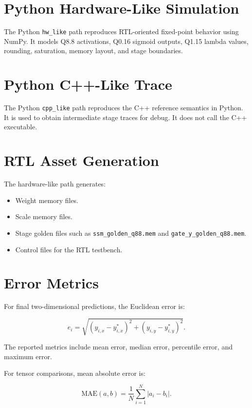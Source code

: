 \section{Python Hardware-Like Simulation}

The Python \texttt{hw\_like} path reproduces RTL-oriented fixed-point behavior using NumPy. It models Q8.8 activations, Q0.16 sigmoid outputs, Q1.15 lambda values, rounding, saturation, memory layout, and stage boundaries.

\section{Python C++-Like Trace}

The Python \texttt{cpp\_like} path reproduces the C++ reference semantics in Python. It is used to obtain intermediate stage traces for debug. It does not call the C++ executable.

\section{RTL Asset Generation}

The hardware-like path generates:

\begin{itemize}
  \item Weight memory files.
  \item Scale memory files.
  \item Stage golden files such as \texttt{ssm\_golden\_q88.mem} and \texttt{gate\_y\_golden\_q88.mem}.
  \item Control files for the RTL testbench.
\end{itemize}

\section{Error Metrics}

For final two-dimensional predictions, the Euclidean error is:

\begin{equation}
  e_i = \sqrt{(y_{i,x} - y^{\ast}_{i,x})^2 + (y_{i,y} - y^{\ast}_{i,y})^2}.
\end{equation}

The reported metrics include mean error, median error, percentile error, and maximum error.

For tensor comparisons, mean absolute error is:

\begin{equation}
  \mathrm{MAE}(a,b) = \frac{1}{N}\sum_{i=1}^{N}|a_i - b_i|.
\end{equation}

